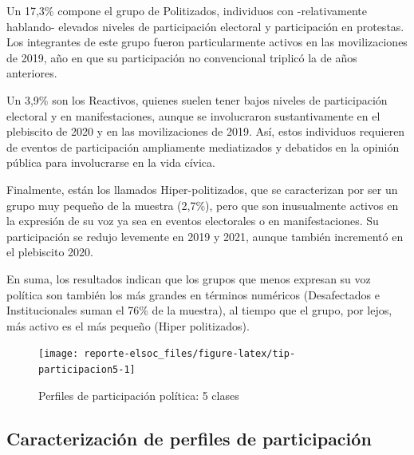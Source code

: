 \documentclass[
  12pt,
]{book}
\begin{document}
Un 17,3\% compone el grupo de Politizados, individuos con -relativamente hablando- elevados niveles de participación electoral y participación en protestas. Los integrantes de este grupo fueron particularmente activos en las movilizaciones de 2019, año en que su participación no convencional triplicó la de años anteriores.

Un 3,9\% son los Reactivos, quienes suelen tener bajos niveles de participación electoral y en manifestaciones, aunque se involucraron sustantivamente en el plebiscito de 2020 y en las movilizaciones de 2019. Así, estos individuos requieren de eventos de participación ampliamente mediatizados y debatidos en la opinión pública para involucrarse en la vida cívica.

Finalmente, están los llamados Hiper-politizados, que se caracterizan por ser un grupo muy pequeño de la muestra (2,7\%), pero que son inusualmente activos en la expresión de su voz ya sea en eventos electorales o en manifestaciones. Su participación se redujo levemente en 2019 y 2021, aunque también incrementó en el plebiscito 2020.

En suma, los resultados indican que los grupos que menos expresan su voz política son también los más grandes en términos numéricos (Desafectados e Institucionales suman el 76\% de la muestra), al tiempo que el grupo, por lejos, más activo es el más pequeño (Hiper politizados).

\begin{figure}

{\centering \texttt{[image: reporte-elsoc\_files/figure-latex/tip-participacion5-1]} 

}

\caption{Perfiles de participación política: 5 clases}\label{fig:tip-participacion5}
\end{figure}

\hypertarget{caracterizaciuxf3n-de-perfiles-de-participaciuxf3n}{%
\subsection*{Caracterización de perfiles de participación}\label{caracterizaciuxf3n-de-perfiles-de-participaciuxf3n}}
\end{document}
